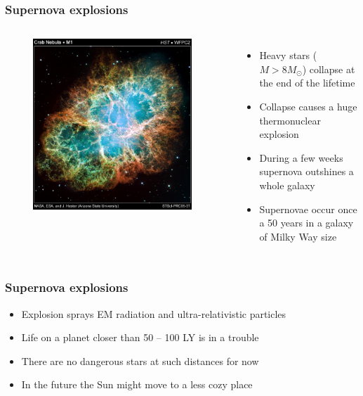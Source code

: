 \documentclass[aspectratio=169]{beamer}
\begin{document}
\begin{frame}
\frametitle{Supernova explosions}
\begin{columns}[c]
\begin{figure}
\includegraphics[width=0.95\textwidth]{img/crab_nebula_web_print.jpg}
\end{figure}
\begin{itemize}
\item Heavy stars ($M > 8 M_\odot$) collapse at the end of the lifetime
\item Collapse causes a huge thermonuclear explosion
\item During a few weeks supernova outshines a whole galaxy
\item Supernovae occur once a 50 years in a galaxy of Milky Way size
\end{itemize}
\end{columns}
\end{frame}

\begin{frame}
\frametitle{Supernova explosions}
\begin{itemize}
\item Explosion sprays EM radiation and ultra-relativistic particles
\item Life on a planet closer than 50 -- 100 LY is in a trouble
\item There are no dangerous stars at such distances for now
\item In the future the Sun might move to a less cozy place
\end{itemize}
\end{frame}
\end{document}
